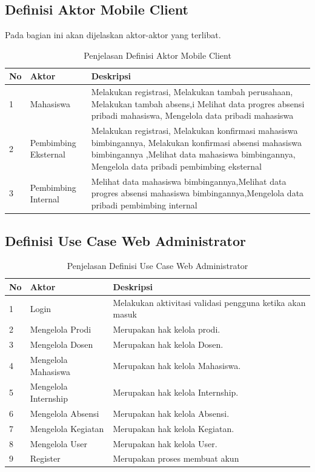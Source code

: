 \subsection{Definisi Aktor Mobile Client}
Pada bagian ini akan dijelaskan aktor-aktor yang terlibat.

\begin{table}[h!]
\centering
\begin{tabular}{| l | p{3cm} | p{8cm} |} 
 \hline
 \textbf{No}   & \textbf{Aktor} & \textbf{Deskripsi}\\ 
\hline
1   & Mahasiswa & Melakukan registrasi, Melakukan tambah perusahaan, Melakukan tambah absens,i Melihat data progres absensi pribadi mahasiswa, Mengelola data pribadi mahasiswa\\ 
\hline
2   & Pembimbing Eksternal & Melakukan registrasi, Melakukan konfirmasi mahasiswa bimbingannya, Melakukan konfirmasi absensi mahasiswa bimbingannya ,Melihat data mahasiswa bimbingannya, Mengelola data pribadi pembimbing eksternal\\ 
\hline
3   & Pembimbing Internal & Melihat data mahasiswa bimbingannya,Melihat data progres absensi mahasiswa bimbingannya,Mengelola data pribadi pembimbing internal
 \\  
 \hline
\end{tabular}
\caption{Penjelasan Definisi Aktor Mobile Client}
\label{table:7}
\end{table}

\newpage

\subsection{Definisi Use Case Web Administrator }	
\begin{table}[h!]
\centering
\begin{tabular}{| l | p{5cm} | p{5cm} |} 
 \hline
 \textbf{No}   & \textbf{Aktor} & \textbf{Deskripsi}\\ 
\hline
1   & Login & Melakukan aktivitasi validasi pengguna ketika akan masuk\\ 
\hline
2   & Mengelola Prodi & Merupakan hak kelola prodi.\\ 
\hline
3   & Mengelola Dosen & Merupakan hak kelola Dosen.\\ 
 \hline
4   & Mengelola Mahasiswa & Merupakan hak kelola Mahasiswa.\\ 
 \hline
5   & Mengelola Internship & Merupakan hak kelola Internship.\\ 
 \hline
6   & Mengelola Absensi & Merupakan hak kelola Absensi.\\ 
 \hline
7   & Mengelola Kegiatan & Merupakan hak kelola Kegiatan.\\ 
 \hline
8   & Mengelola User & Merupakan hak kelola User.\\ 
 \hline
9   & Register & Merupakan proses membuat akun\\ 
 \hline
\end{tabular}
\caption{Penjelasan Definisi Use Case Web Administrator}
\label{table:8}
\end{table}

